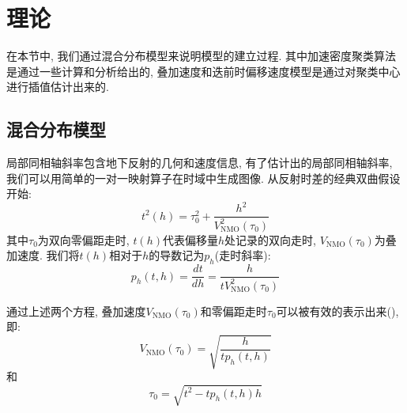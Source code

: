 \section{理论}
在本节中, 我们通过混合分布模型来说明模型的建立过程. 其中加速密度聚类算法是通过一些计算和分析给出的, 叠加速度和迭前时偏移速度模型是通过对聚类中心进行插值估计出来的. 
\subsection{混合分布模型}
局部同相轴斜率包含地下反射的几何和速度信息, 有了估计出的局部同相轴斜率, 我们可以用简单的一对一映射算子在时域中生成图像. 从反射时差的经典双曲假设开始: 
\begin{equation}
    t^2(h)=\tau_0^2+\frac{h^2}{V_{\mathrm{NMO}}^2(\tau_0)}
\end{equation}
其中$\tau_0$为双向零偏距走时, $t(h)$代表偏移量$h$处记录的双向走时, $V_{\mathrm{NMO}}(\tau_0)$为叠加速度. 我们将$t(h)$相对于$h$的导数记为$p_h$(走时斜率):
\begin{equation}
    p_{h}(t, h)=\frac{d t}{d h}=\frac{h}{t V_{\mathrm{NMO}}^{2}\left(\tau_{0}\right)}
\end{equation}

通过上述两个方程, 叠加速度$V_{\mathrm{NMO}}(\tau_0)$和零偏距走时$\tau_0$可以被有效的表示出来(\cite{Ottolini1983, Fomel2007}), 即: 
\begin{equation}
    V_{\mathrm{NMO}}\left(\tau_{0}\right)=\sqrt{\frac{h}{t p_{h}(t, h)}}
    \label{equ:3}
\end{equation}
和
\begin{equation}
    \tau_{0}=\sqrt{t^{2}-t p_{h}(t, h) h}
    \label{equ:4}
\end{equation}

